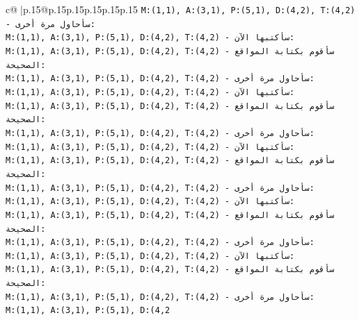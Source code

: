 \documentclass{article}
\begin{document}
{\begin{supertabular}{c@{$\;$}|p{.15\linewidth}@{}p{.15\linewidth}p{.15\linewidth}p{.15\linewidth}p{.15\linewidth}p{.15\linewidth}}
{{{\texttt{M:(1,1), A:(3,1), P:(5,1), D:(4,2), T:(4,2) {-} سأحاول مرة أخرى:} \\
\texttt{M:(1,1), A:(3,1), P:(5,1), D:(4,2), T:(4,2) {-} سأكتبها الآن:} \\
\texttt{M:(1,1), A:(3,1), P:(5,1), D:(4,2), T:(4,2) {-} سأقوم بكتابة المواقع الصحيحة:} \\
\texttt{M:(1,1), A:(3,1), P:(5,1), D:(4,2), T:(4,2) {-} سأحاول مرة أخرى:} \\
\texttt{M:(1,1), A:(3,1), P:(5,1), D:(4,2), T:(4,2) {-} سأكتبها الآن:} \\
\texttt{M:(1,1), A:(3,1), P:(5,1), D:(4,2), T:(4,2) {-} سأقوم بكتابة المواقع الصحيحة:} \\
\texttt{M:(1,1), A:(3,1), P:(5,1), D:(4,2), T:(4,2) {-} سأحاول مرة أخرى:} \\
\texttt{M:(1,1), A:(3,1), P:(5,1), D:(4,2), T:(4,2) {-} سأكتبها الآن:} \\
\texttt{M:(1,1), A:(3,1), P:(5,1), D:(4,2), T:(4,2) {-} سأقوم بكتابة المواقع الصحيحة:} \\
\texttt{M:(1,1), A:(3,1), P:(5,1), D:(4,2), T:(4,2) {-} سأحاول مرة أخرى:} \\
\texttt{M:(1,1), A:(3,1), P:(5,1), D:(4,2), T:(4,2) {-} سأكتبها الآن:} \\
\texttt{M:(1,1), A:(3,1), P:(5,1), D:(4,2), T:(4,2) {-} سأقوم بكتابة المواقع الصحيحة:} \\
\texttt{M:(1,1), A:(3,1), P:(5,1), D:(4,2), T:(4,2) {-} سأحاول مرة أخرى:} \\
\texttt{M:(1,1), A:(3,1), P:(5,1), D:(4,2), T:(4,2) {-} سأكتبها الآن:} \\
\texttt{M:(1,1), A:(3,1), P:(5,1), D:(4,2), T:(4,2) {-} سأقوم بكتابة المواقع الصحيحة:} \\
\texttt{M:(1,1), A:(3,1), P:(5,1), D:(4,2), T:(4,2) {-} سأحاول مرة أخرى:} \\
\texttt{M:(1,1), A:(3,1), P:(5,1), D:(4,2} \\
            }
        }
    }
     \\ \\


\end{supertabular}}
\end{document}
